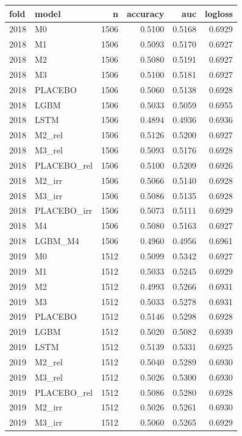 \begin{tabular}{llrrrr}
\toprule
fold & model & n & accuracy & auc & logloss \\
\midrule
2018 & M0 & 1506 & 0.5100 & 0.5168 & 0.6929 \\
2018 & M1 & 1506 & 0.5093 & 0.5170 & 0.6927 \\
2018 & M2 & 1506 & 0.5080 & 0.5191 & 0.6927 \\
2018 & M3 & 1506 & 0.5100 & 0.5181 & 0.6927 \\
2018 & PLACEBO & 1506 & 0.5060 & 0.5138 & 0.6928 \\
2018 & LGBM & 1506 & 0.5033 & 0.5059 & 0.6955 \\
2018 & LSTM & 1506 & 0.4894 & 0.4936 & 0.6936 \\
2018 & M2\_rel & 1506 & 0.5126 & 0.5200 & 0.6927 \\
2018 & M3\_rel & 1506 & 0.5093 & 0.5176 & 0.6928 \\
2018 & PLACEBO\_rel & 1506 & 0.5100 & 0.5209 & 0.6926 \\
2018 & M2\_irr & 1506 & 0.5066 & 0.5140 & 0.6928 \\
2018 & M3\_irr & 1506 & 0.5086 & 0.5135 & 0.6928 \\
2018 & PLACEBO\_irr & 1506 & 0.5073 & 0.5111 & 0.6929 \\
2018 & M4 & 1506 & 0.5080 & 0.5163 & 0.6927 \\
2018 & LGBM\_M4 & 1506 & 0.4960 & 0.4956 & 0.6961 \\
2019 & M0 & 1512 & 0.5099 & 0.5342 & 0.6927 \\
2019 & M1 & 1512 & 0.5033 & 0.5245 & 0.6929 \\
2019 & M2 & 1512 & 0.4993 & 0.5266 & 0.6931 \\
2019 & M3 & 1512 & 0.5033 & 0.5278 & 0.6931 \\
2019 & PLACEBO & 1512 & 0.5146 & 0.5298 & 0.6928 \\
2019 & LGBM & 1512 & 0.5020 & 0.5082 & 0.6939 \\
2019 & LSTM & 1512 & 0.5139 & 0.5331 & 0.6925 \\
2019 & M2\_rel & 1512 & 0.5040 & 0.5289 & 0.6930 \\
2019 & M3\_rel & 1512 & 0.5026 & 0.5300 & 0.6930 \\
2019 & PLACEBO\_rel & 1512 & 0.5086 & 0.5280 & 0.6928 \\
2019 & M2\_irr & 1512 & 0.5026 & 0.5261 & 0.6930 \\
2019 & M3\_irr & 1512 & 0.5060 & 0.5265 & 0.6929 \\

\end{tabular}
